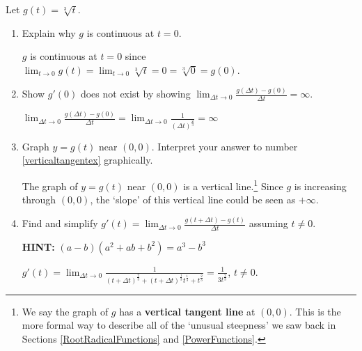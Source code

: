 \documentclass{ximera}
\begin{document}
\begin{problem}  Let  $g(t) = \sqrt[3]{t}$.  

\begin{enumerate}

\item Explain why $g$ is continuous at $t = 0$.

\begin{solution}
$g$ is continuous at $t=0$ since $\lim_{t \rightarrow 0} g(t) = \lim_{t \rightarrow 0} \sqrt[3]{t} = 0 = \sqrt[3]{0} = g(0)$.
\end{solution}

\item\label{verticaltangentex} Show $g'(0)$ does not exist by showing $\lim_{\Delta t \rightarrow 0} \frac{g(\Delta t) - g(0)}{\Delta t} = \infty$. 

\begin{solution}
$\lim_{\Delta t \rightarrow 0} \frac{g(\Delta t) - g(0)}{\Delta t} =   \lim_{\Delta t \rightarrow 0} \frac{1}{(\Delta t)^{\frac{2}{3}}}   =  \infty$
\end{solution}
        
\item  Graph $y = g(t)$ near $(0,0)$.  Interpret your answer to number \ref{verticaltangentex} graphically.

\begin{solution}
The graph of $y = g(t)$ near $(0,0)$ is a vertical line.\footnote{We say the graph of $g$ has a  \textbf{vertical tangent line} at $(0,0)$.  This is the more formal way to describe all of the `unusual steepness' we saw back in Sections \ref{RootRadicalFunctions} and \ref{PowerFunctions}.}  Since $g$ is increasing through $(0,0)$, the `slope' of this vertical line could be seen as $+ \infty$. 
\end{solution}



\item  Find and simplify  $g'(t) =  \lim_{\Delta t \rightarrow 0} \frac{g(t+\Delta t) - g(t)}{\Delta t}$ assuming $t \neq 0$.

\textbf{HINT:}  $(a-b)\left(a^2+ab+b^2\right) = a^3 - b^3$

\begin{solution}
 $g'(t) = \lim_{\Delta t \rightarrow 0} \frac{1}{(t+\Delta t)^{\frac{2}{3}} + (t+\Delta t)^{\frac{1}{3}} t^{\frac{1}{3}} + t^{\frac{2}{3}}} = \frac{1}{3 t^{\frac{2}{3}}}$, $t \neq 0$.
\end{solution}
        
\end{enumerate}

\end{problem}
\end{document}

